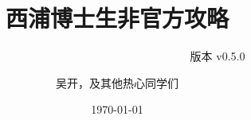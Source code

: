 \documentclass[lang=cn,12pt,newtx]{elegantbook}
\title{西浦博士生非官方攻略}
\subtitle{~~~~~~~~~~~~~~~~~~~~~~~~~~~~~~~~~~~~版本 v0.5.0}
\author{吴开，及其他热心同学们}
\date{\today}
\begin{document}
\maketitle
\frontmatter


\tableofcontents
\mainmatter






% 
% 


\backmatter	




\makeatletter
\makeatother
\end{document}
